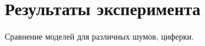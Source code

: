 \section{ Результаты эксперимента }\label{sec:results}

Сравнение моделей для различных шумов, циферки.